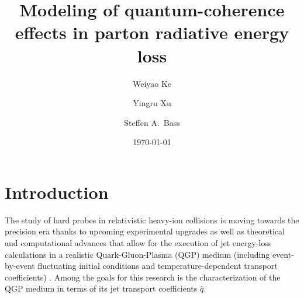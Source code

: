\documentclass[aps, prc, reprint, amsmath, groupedaddress, nofootinbib]{revtex4-1}
\begin{document}
\title{Modeling of quantum-coherence effects in parton radiative energy loss}
\author{Weiyao Ke}
\author{Yingru Xu}
\author{Steffen A.\ Bass}
\date{\today}
\maketitle 

\section{Introduction}
The study of hard probes in relativistic heavy-ion collisions is moving towards the precision era thanks to upcoming experimental upgrades \cite{ATLAS-Collaboration:2012iwa,Abelevetal:2014dna,STAR:upgrade-hf,Adare:2015kwa,CMS:2017dec} as well as theoretical and computational advances that allow for the execution of jet energy-loss calculations in a realistic Quark-Gluon-Plasma (QGP) medium (including event-by-event fluctuating initial conditions and temperature-dependent transport coefficients) \cite{Wang:1994fx,Zakharov:1996fv,Baier:1996sk,Zakharov:1997uu,Arnold:2002zm,Gyulassy:2003mc,Kovner:2003zj,CasalderreySolana:2007pr,Bass:2008rv,Schenke:2009gb,Majumder:2009zu,Majumder:2010qh,Armesto:2011ht,Zapp:2011ya,Ovanesyan:2011xy,Kang:2014xsa,Cao:2016gvr,Kauder:2018cdt,Cao:2017zih}. Among the goals for this research is the characterization of the QGP medium in terms of its jet transport coefficients $\hat{q}$.
\end{document}

